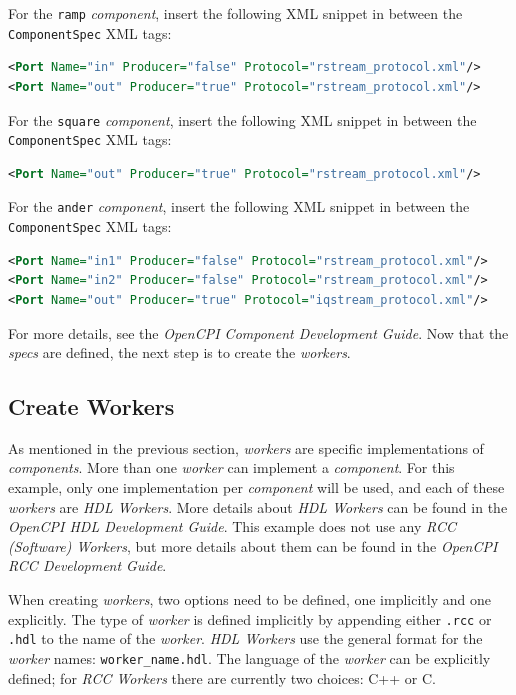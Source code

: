 \bstart
For the \verb+ramp+ \textit{component}, insert the following XML snippet in between the \verb+ComponentSpec+ XML tags:

\begin{lstlisting}[language=xml]
<Port Name="in" Producer="false" Protocol="rstream_protocol.xml"/>
<Port Name="out" Producer="true" Protocol="rstream_protocol.xml"/>
\end{lstlisting}
\bend
\bstart
For the \verb+square+ \textit{component}, insert the following XML snippet in between the \verb+ComponentSpec+ XML tags:

\begin{lstlisting}[language=xml]
<Port Name="out" Producer="true" Protocol="rstream_protocol.xml"/>
\end{lstlisting}
\bend
\bstart
For the \verb+ander+ \textit{component}, insert the following XML snippet in between the \verb+ComponentSpec+ XML tags:

\begin{lstlisting}[language=xml]
<Port Name="in1" Producer="false" Protocol="rstream_protocol.xml"/>
<Port Name="in2" Producer="false" Protocol="rstream_protocol.xml"/>
<Port Name="out" Producer="true" Protocol="iqstream_protocol.xml"/>
\end{lstlisting}
\bend
For more details, see the \textit{OpenCPI Component Development Guide}. Now that the \textit{specs} are defined, the next step is to create the \textit{workers}.

\subsection{Create Workers}
As mentioned in the previous section, \textit{workers} are specific implementations of \textit{components}. More than one \textit{worker} can implement a \textit{component}. For this example, only one implementation per \textit{component} will be used, and each of these \textit{workers} are \textit{HDL Workers}. More details about \textit{HDL Workers} can be found in the \textit{OpenCPI HDL Development Guide}.
This example does not use any \textit{RCC (Software) Workers}, but more details about them can be found in the \textit{OpenCPI RCC Development Guide}.\newline

When creating \textit{workers}, two options need to be defined, one implicitly and one explicitly. The type of \textit{worker} is defined implicitly by appending either \verb+.rcc+ or \verb+.hdl+ to the name of the \textit{worker}. \textit{HDL Workers} use the general format for the \textit{worker} names: \verb+worker_name.hdl+. The language of the \textit{worker} can be explicitly defined; for \textit{RCC Workers} there are currently two choices: C++ or C.\newline

